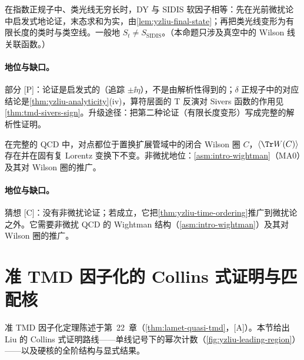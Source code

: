 \begin{proposition}\label{prop:yzliu-dy-sidis-exp}
在指数正规子中、类光线无穷长时，DY 与 SIDIS 软因子相等\cite[附录~C]{Liu:2023pjb}：先在光前微扰论中启发式地论证，末态求和为实，由\cref{lem:yzliu-final-state}；再把类光线变形为有限长度的类时与类空线。一般地 $S_t\ne S_{\mathrm{SIDIS}}$。（本命题只涉及真空中的 Wilson 线关联函数。）
\end{proposition}

\paragraph{地位与缺口。}部分 [P]：论证是启发式的（追踪 $\pm\ii\eta$），不是由解析性得到的；$\delta$ 正规子中的对应结论是\cref{thm:yzliu-analyticity}(iv)，算符层面的 T 反演对 Sivers 函数的作用见\cref{thm:tmd-sivers-sign}。升级途径：把第二种论证（有限长度变形）写成完整的解析性证明。

\begin{conjecture}\label{conj:yzliu-complex-wilson}
在完整的 QCD 中，对点都位于置换扩展管域中的闭合 Wilson 圈 $C$，$\langle\Tr W(C)\rangle$ 存在并在固有复 Lorentz 变换下不变\cite[第~3.4~节]{Liu:2023pjb}。非微扰地位：\cref{asm:intro-wightman}（MA0）及其对 Wilson 圈的推广。
\end{conjecture}

\paragraph{地位与缺口。}猜想 [C]：没有非微扰论证；若成立，它把\cref{thm:yzliu-time-ordering}推广到微扰论之外。它需要非微扰 QCD 的 Wightman 结构（\cref{asm:intro-wightman}）及其对 Wilson 圈的推广。

\section{准 TMD 因子化的 Collins 式证明与匹配核}\label{sec:yzliu-quasi-tmd}

准 TMD 因子化定理陈述于第~22~章（\cref{thm:lamet-quasi-tmd}，[A]）。本节给出 Liu 的 Collins 式证明路线——单线记号下的幂次计数（\cref{fig:yzliu-leading-region}）——以及硬核的全阶结构与显式结果。

